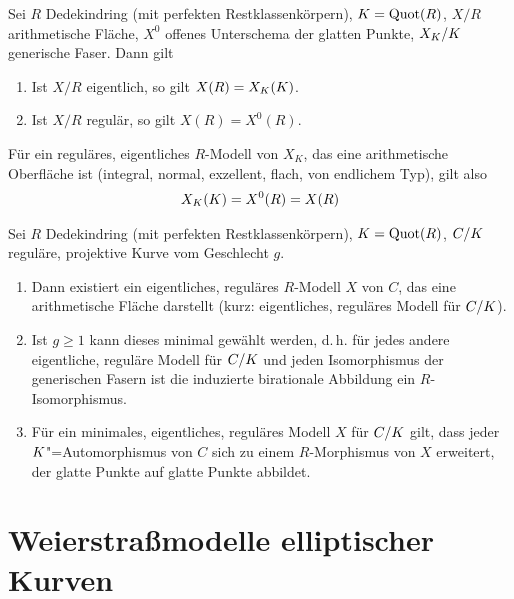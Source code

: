 \documentclass[german]{scrreprt}
\begin{document}
\begin{Satz}\label{thm:ratpkteregulaeremodelle}
  Sei $R$ Dedekindring (mit perfekten Restklassenkörpern),
  $K=\operatorname{Quot}(R)$,
  $X/R$ arithmetische Fläche,
  $X^0$ offenes Unterschema der glatten Punkte,
  $X_{K}/K$ generische Faser.
  Dann gilt
  \begin{enumerate}[label=(\roman*)]
  \item Ist $X/R$ eigentlich, so gilt $X(R)=X_{K}(K)$.
  \item Ist $X/R$ regulär, so gilt $X(R)=X^0(R)$.
  \end{enumerate}
  \cite[Corollary IV.4.4]{silverman2}

  Für ein reguläres, eigentliches $R$-Modell von $X_K$, das eine
  arithmetische Oberfläche ist (integral, normal, exzellent, flach,
  von endlichem Typ), gilt also
  \begin{gather*}
    X_{K}(K)=X^0(R)=X(R)
  \end{gather*}
\end{Satz}

\begin{Satz}
  Sei $R$ Dedekindring (mit perfekten Restklassenkörpern),
  $K=\operatorname{Quot}(R)$,
  $C/K$ reguläre, projektive Kurve vom Geschlecht $g$.
  \begin{enumerate}[label=(\roman*)]
  \item Dann existiert ein eigentliches, reguläres $R$-Modell $X$ von $C$,
    das eine arithmetische Fläche darstellt
    (kurz: eigentliches, reguläres Modell für $C/K$).
    \cite[Proposition IV.4.5(a)]{silverman2}
  \item Ist $g\geq1$ kann dieses minimal gewählt werden, d.\,h.
    für jedes andere eigentliche, reguläre Modell für $C/K$ und jeden
    Isomorphismus der generischen Fasern ist die induzierte birationale
    Abbildung
    ein $R$-Isomorphismus.
    \cite[Proposition IV.4.5(b)]{silverman2}
  \item Für ein minimales, eigentliches, reguläres Modell $X$ für $C/K$
    gilt, dass jeder $K$"=Automorphismus von $C$ sich zu einem
    $R$-Morphismus von $X$ erweitert, der glatte Punkte auf glatte
    Punkte abbildet.
    \cite[Proposition IV.4.6]{silverman2}
  \end{enumerate}
\end{Satz}


\section{Weierstraßmodelle elliptischer Kurven}
\end{document}
